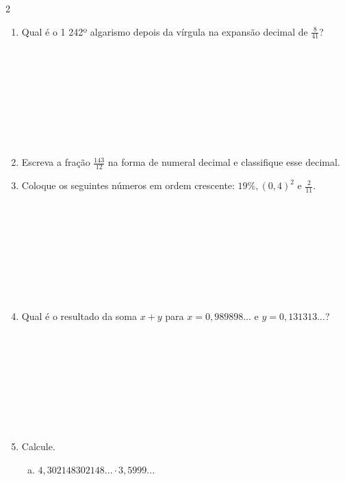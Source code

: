 \documentclass[a4paper,14pt]{article}
\begin{document}
\begin{multicols}{2}
\begin{enumerate}
\begin{enumerate}[a)]
				\item $ab$ \\\\\\\\
				\item $\frac{a}{b}$ \\\\\\\\\\\\\\\\\\
			\end{enumerate}
			\item Qual é o 1 242º algarismo depois da vírgula na expansão decimal de $\frac{8}{41}$? \\\\\\\\\\\\\\\\\\
			\item Escreva a fração $\frac{143}{12}$ na forma de numeral decimal e classifique esse decimal. \newpage
			\item Coloque os seguintes números em ordem crescente: $19\%, (0,4)^2$ e $\frac{2}{11}$. \\\\\\\\\\\\\\\\\\
			\item Qual é o resultado da soma $x + y$ para $x = 0,989898...$ e $y = 0,131313...$? \\\\\\\\\\\\\\\\\\
			\item Calcule.
			\begin{enumerate}[a)]
				\item $4,302148302148... \cdot 3,5999...$ \\\\\\\\\\\\\\\\\\\\\\\\

\end{enumerate}
\end{enumerate}
\end{multicols}
\end{document}
